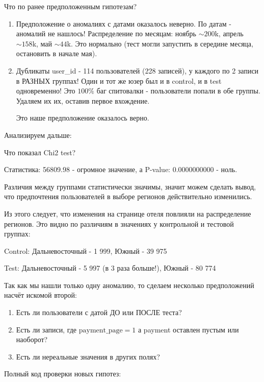 \documentclass[pract]{SCWorks}
\begin{document}
Что по ранее предположенным гипотезам?

\begin{enumerate}
    \item Предположение о аномалиях с датами оказалось неверно. По датам - аномалий не нашлось! 
    Распределение по месяцам: ноябрь $\sim200$k, апрель $\sim158$k, май $\sim44$k. Это нормально (тест могли запустить в 
    середине месяца, остановить в начале мая).
    \item Дубликаты user\_id - 114 пользователей (228 записей), у каждого по 2 записи в РАЗНЫХ группах! 
    Один и тот же юзер был и в control, и в test одновременно! Это $100\%$ баг спитовалки - пользователи попали 
    в обе группы. Удаляем их их, оставив первое вхождение.

    Это наше предположение оказалось верно.
\end{enumerate}

Анализируем дальше:


Что показал Chi2 test?

Статистика: 56809.98 - огромное значение, а P-value: 0.0000000000 - ноль.

Различия между группами статистически значимы, значит можем сделать вывод, что предпочтения пользователей 
в выборе регионов действительно изменились.

Из этого следует, что изменения на странице отеля повлияли на распределение регионов. Это видно по различиям 
в значениях у контрольной и тестовой группах:
    
Control: Дальневосточный - 1 999, Южный - 39 975

Test: Дальневосточный - 5 997 (в 3 раза больше!), Южный - 80 774

Так как мы нашли только одну аномалию, то сделаем несколько предположений насчёт искомой второй:
\begin{enumerate}
    \item Есть ли пользователи с датой ДО или ПОСЛЕ теста?
    \item Есть ли записи, где $\text{payment\_page} = 1$ а payment оставлен пустым или наоборот?
    \item Есть ли нереальные значения в других полях?
\end{enumerate}

Полный код проверки новых гипотез:
\end{document}
